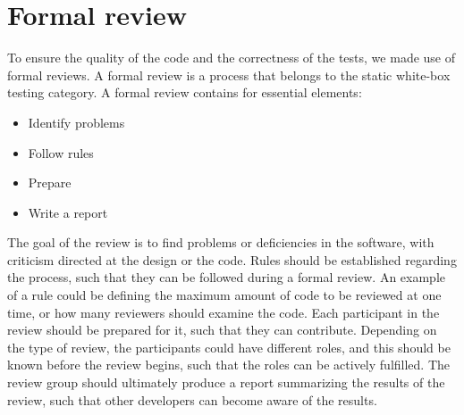 \section{Formal review}
To ensure the quality of the code and the correctness of the tests, we made use of formal reviews.
A formal review is a process that belongs to the static white-box testing category.
A formal review contains for essential elements\cite{SoftwareTesting}:
\begin{itemize}\label{formalreview}
    \item Identify problems
    \item Follow rules
    \item Prepare
    \item Write a report
\end{itemize}
The goal of the review is to find problems or deficiencies in the software, with criticism directed at the design or the code.
Rules should be established regarding the process, such that they can be followed during a formal review.
An example of a rule could be defining the maximum amount of code to be reviewed at one time, or how many reviewers should examine the code.
Each participant in the review should be prepared for it, such that they can contribute.
Depending on the type of review, the participants could have different roles, and this should be known before the review begins, such that the roles can be actively fulfilled.
The review group should ultimately produce a report summarizing the results of the review, such that other developers can become aware of the results. 

